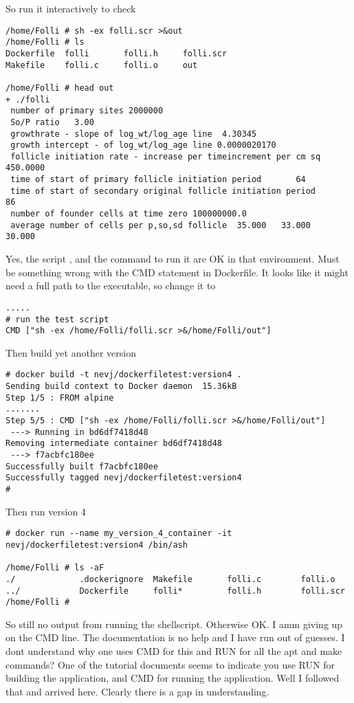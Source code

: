 \documentclass{article}  %
\begin{document}
So run it interactively to check
\begin{verbatim}
/home/Folli # sh -ex folli.scr >&out
/home/Folli # ls
Dockerfile  folli       folli.h     folli.scr
Makefile    folli.c     folli.o     out

/home/Folli # head out
+ ./folli
 number of primary sites 2000000
 So/P ratio   3.00
 growthrate - slope of log_wt/log_age line  4.30345
 growth intercept - of log_wt/log_age line 0.0000020170
 follicle initiation rate - increase per timeincrement per cm sq 450.0000
 time of start of primary follicle initiation period       64
 time of start of secondary original follicle initiation period       86
 number of founder cells at time zero 100000000.0
 average number of cells per p,so,sd follicle  35.000   33.000   30.000 
\end{verbatim}
 Yes, the script , and the command to run it are OK in that environment. Must be something wrong with the CMD statement in Dockerfile. It looks like it might need a full path to the executable, so change it to 
\begin{verbatim}
.....
# run the test script
CMD ["sh -ex /home/Folli/folli.scr >&/home/Folli/out"]
\end{verbatim}
Then build yet another version
\begin{verbatim}
# docker build -t nevj/dockerfiletest:version4 .
Sending build context to Docker daemon  15.36kB
Step 1/5 : FROM alpine
.......
Step 5/5 : CMD ["sh -ex /home/Folli/folli.scr >&/home/Folli/out"]
 ---> Running in bd6df7418d48
Removing intermediate container bd6df7418d48
 ---> f7acbfc180ee
Successfully built f7acbfc180ee
Successfully tagged nevj/dockerfiletest:version4
# 
\end{verbatim}
Then run version 4 
\begin{verbatim}
# docker run --name my_version_4_container -it nevj/dockerfiletest:version4 /bin/ash

/home/Folli # ls -aF
./             .dockerignore  Makefile       folli.c        folli.o
../            Dockerfile     folli*         folli.h        folli.scr
/home/Folli # 
\end{verbatim}
So still no output from running the shellscript. Otherwise OK. I amm giving up on the CMD line. The documentation is no help and I have run out of guesses. I dont understand why one uses CMD for this and RUN for all the apt and make commands?  One of the tutorial  documents seems to indicate you use RUN for building the application, and CMD for running the application. Well I followed that and arrived  here.  Clearly there is a gap in understanding.
\end{document}
